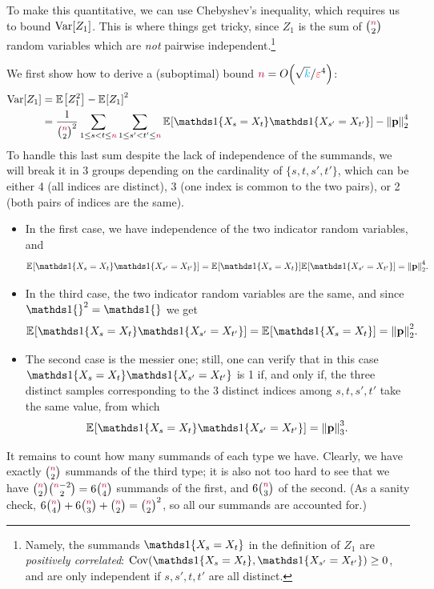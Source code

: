 To make this quantitative, we can use Chebyshev's inequality, which requires us to bound $\operatorname{Var}[Z_1]$. This is where things get tricky, since $Z_1$ is the sum of $\binom{{\textcolor{purple}{n}}}{2}$ random variables which are \emph{not} pairwise independent.\footnote{Namely, the summands $\indic{X_s=X_t}$ in the definition of $Z_1$ are \emph{positively correlated}: $\cov(\indic{X_s=X_t},\indic{X_{s'}=X_{t'}}) \geq 0$, and are only independent if $s,s',t,t'$ are all distinct.} 

We first show how to derive a (suboptimal) bound $\ns=\bigO{\sqrt{\ab}/\dst^4}$:
\begin{align*}
  \Var[Z_1] 
   &= \bEE{Z_1^2} - \bEE{Z_1}^2\\
   &= \frac{1}{\binom{\ns}{2}^2} \sum_{1\leq s < t \leq \ns}\sum_{1\leq s' < t' \leq \ns} \bEE{\indic{X_s=X_t}\indic{X_{s'}=X_{t'}}} - \normtwo{\p}^4
\end{align*}
To handle this last sum despite the lack of independence of the summands, we will break it in 3 groups depending on the cardinality of $\{s,t,s',t'\}$, which can be either 4 (all indices are distinct), 3 (one index is common to the two pairs), or 2 (both pairs of indices are the same).
\begin{itemize}
  \item In the first case, we have independence of the two indicator random variables, and 
  \[
    \bEE{\indic{X_s=X_t}\indic{X_{s'}=X_{t'}}} = \bEE{\indic{X_s=X_t}}\bEE{\indic{X_{s'}=X_{t'}}} = \normtwo{\p}^4.
  \]
  \item In the third case, the two indicator random variables are the same, and since $\indic{}^2=\indic{}$ we get
  \[
    \bEE{\indic{X_s=X_t}\indic{X_{s'}=X_{t'}}} = \bEE{\indic{X_s=X_t}} = \normtwo{\p}^2.
  \]
  \item The second case is the messier one; still, one can verify that in this case $\indic{X_s=X_t}\indic{X_{s'}=X_{t'}}$ is 1 if, and only if, the three distinct samples corresponding to the 3 distinct indices among $s,t,s',t'$ take the same value, from which
  \[
    \bEE{\indic{X_s=X_t}\indic{X_{s'}=X_{t'}}} = \norm{\p}_3^3.
  \]
\end{itemize}
It remains to count how many summands of each type we have. Clearly, we have exactly $\binom{{\textcolor{purple}{n}}}{2}$ summands of the third type; it is also not too hard to see that we have $\binom{{\textcolor{purple}{n}}}{2}\binom{{\textcolor{purple}{n}}-2}{2} = 6\binom{{\textcolor{purple}{n}}}{4}$ summands of the first, and $6\binom{{\textcolor{purple}{n}}}{3}$ of the second. (As a sanity check, $6\binom{{\textcolor{purple}{n}}}{4}+6\binom{{\textcolor{purple}{n}}}{3}+\binom{{\textcolor{purple}{n}}}{2} = \binom{{\textcolor{purple}{n}}}{2}^2$, so all our summands are accounted for.)

